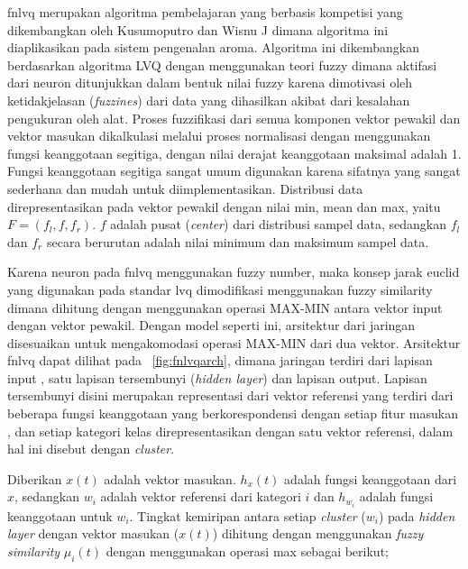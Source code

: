 \Gls{fnlvq} merupakan algoritma pembelajaran yang berbasis kompetisi yang
dikembangkan oleh Kusumoputro dan Wisnu J \cite{Kusumoputro:2002} dimana
algoritma ini diaplikasikan pada sistem pengenalan aroma.  Algoritma ini
dikembangkan berdasarkan algoritma LVQ dengan menggunakan teori fuzzy dimana
aktifasi dari neuron ditunjukkan dalam bentuk nilai fuzzy karena dimotivasi oleh
ketidakjelasan (\emph{fuzzines}) dari data yang dihasilkan akibat dari kesalahan
pengukuran oleh alat. Proses fuzzifikasi dari semua komponen vektor pewakil dan
vektor masukan dikalkulasi melalui proses normalisasi dengan menggunakan fungsi
keanggotaan segitiga, dengan nilai derajat keanggotaan maksimal adalah 1. Fungsi
keanggotaan segitiga sangat umum digunakan karena sifatnya yang sangat sederhana
dan mudah untuk diimplementasikan. Distribusi data direpresentasikan pada vektor
pewakil dengan nilai min, mean dan max, yaitu $F = (f_l, f, f_r)$. $f$ adalah
pusat (\emph{center}) dari distribusi sampel data, sedangkan $f_l$ dan $f_r$
secara berurutan adalah nilai minimum dan maksimum sampel data.

Karena neuron pada \gls{fnlvq} menggunakan fuzzy number, maka konsep jarak
euclid yang digunakan pada standar \gls{lvq} dimodifikasi menggunakan fuzzy
similarity dimana dihitung dengan menggunakan operasi MAX-MIN antara vektor
input dengan vektor pewakil. Dengan model seperti ini, arsitektur dari jaringan
disesuaikan untuk mengakomodasi operasi MAX-MIN dari dua vektor. Arsitektur
\gls{fnlvq} dapat dilihat pada \pic~\ref{fig:fnlvqarch}, dimana jaringan terdiri
dari lapisan input , satu lapisan tersembunyi (\emph{hidden layer}) dan lapisan
output. Lapisan tersembunyi disini merupakan representasi dari vektor referensi
yang terdiri dari beberapa fungsi keanggotaan yang berkorespondensi dengan
setiap fitur masukan , dan setiap kategori  kelas direpresentasikan dengan satu
vektor referensi, dalam hal ini disebut dengan \emph{cluster}.


Diberikan $x(t)$ adalah vektor masukan. $h_x(t)$ adalah fungsi keanggotaan dari
$x$, sedangkan $w_i$ adalah vektor referensi dari kategori $i$ dan $h_{w_i}$
adalah fungsi keanggotaan untuk $w_i$. Tingkat kemiripan antara setiap
\emph{cluster} ($w_i$) pada \emph{hidden layer} dengan vektor masukan ($x(t)$)
dihitung dengan menggunakan \emph{fuzzy similarity} $\mu_i(t)$ dengan
menggunakan operasi max sebagai berikut;

